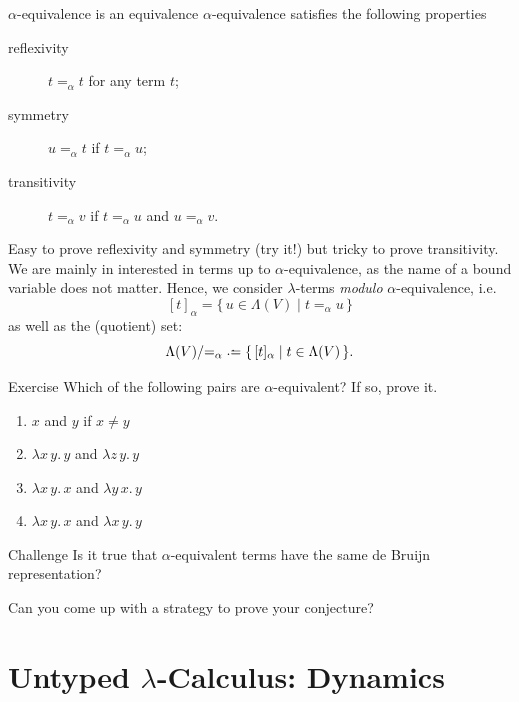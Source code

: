 \begin{frame}{$\alpha$-equivalence is an equivalence}
  $\alpha$-equivalence satisfies the following properties
  \begin{description}
    \item[reflexivity] $t =_\alpha t$ for any term $t$;
    \item[symmetry] $u =_\alpha t$ if $t =_\alpha u$;
    \item[transitivity] $t =_\alpha v$ if $t =_\alpha u$ and $u =_\alpha v$. 
  \end{description}
  Easy to prove reflexivity and symmetry (try it!) but tricky to prove transitivity.
  \vfill
  We are mainly in interested in \alert{terms up to $\alpha$-equivalence}, as the name of a bound variable does not matter. 
  Hence, we consider $\lambda$-terms \emph{modulo} $\alpha$-equivalence, i.e.\
  \[
    [t]_{\alpha} = \{\, u \in \Lambda(V) \mid t =_\alpha u \,\}
  \]
  as well as the (quotient) set:
  \[
    \Lambda(V)/{=_\alpha} \defeq \{\, [t]_{\alpha} \mid t \in \Lambda(V) \,\}.
  \]
\end{frame}

\begin{frame}{Exercise}
Which of the following pairs are $\alpha$-equivalent? If so, prove it.
\begin{enumerate}
  \item $x$ and $y$ if $x \neq y$ 
  \item $\lambda x\,y.\, y$ and $\lambda z\,y.\, y$
  \item $\lambda x\,y.\, x$ and $\lambda y\,x.\, y$
  \item $\lambda x\,y.\, x$ and $\lambda x\,y.\, y$
\end{enumerate}
\vfill
\begin{block}{Challenge}
Is it true that $\alpha$-equivalent terms have the same de Bruijn representation?

Can you come up with a strategy to prove your conjecture?
\end{block}

\end{frame}



\section{Untyped \texorpdfstring{$\lambda$}{λ}-Calculus: Dynamics}

